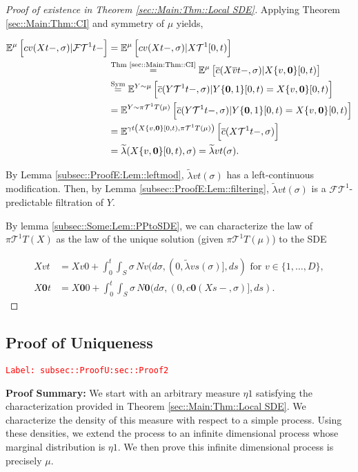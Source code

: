 \documentclass[12pt]{article}
\newcommand{\mb}{\mathbb}
\newcommand{\mc}{\mathcal}
\newcommand{\ov}{\overline}
\newcommand{\os}{\overset}
\newcommand{\te}{\text}
\newcommand{\tr}{\textcolor{red}}
\newcommand{\labe}[1]{\tr{\texttt{Label: #1}}}
\newcommand{\pfsum}{\textbf{Proof Summary: }}
\newcommand{\ind}{\hspace{24pt}}
\newcommand{\exmu}[2]{\mb{E}^{#1}\left[#2\right]}	%
\renewcommand{\root}{\mathbf{0}}				%
\renewcommand{\v}{v}							%
\renewcommand{\S}{S}							%
\newcommand{\s}{\sigma}							%
\newcommand{\T}{T}								%
\renewcommand{\t}{t}							%
\newcommand{\proj}{\pi}							%
\renewcommand{\tt}{s}							%
\newcommand{\F}{\mc{F}}							%
\newcommand{\X}{X}								%
\newcommand{\IGr}{c}							%
\newcommand{\cl}{\ov}							%
\newcommand{\degr}{D}							%
\newcommand{\IGrg}{\ov{c}}						%
\newcommand{\tree}{\mc{T}}						%
\newcommand{\sln}[1]{^{#1}}						%
\newcommand{\poiss}{N}							%
\newcommand{\alt}[1]{\widetilde{#1}}			%
\newcommand{\m}{\mu}							%
\newcommand{\mmm}{\eta}							%
\newcommand{\cm}{\gamma}						%
\newcommand{\XX}{Y}								%
\newcommand{\crate}{\alt{\lambda}}				%
\begin{document}
\begin{proof}[Proof of existence in Theorem \ref{sec::Main:Thm::Local SDE}]
Applying Theorem \ref{sec::Main:Thm::CI} and symmetry of \(\m{}{}{}\) yields,

\begin{align*}
\exmu{\m{}{}{}}{\IGr{\v}(\X{}{\t-},\s)|\F{\tree\sln{1}}{\t-}} &= \exmu{\m{}{}{}}{\IGr{\v}(\X{}{\t-},\s)|\X{\tree\sln{1}}{[0,\t)}}\\
&\os{\te{Thm \ref{sec::Main:Thm::CI}}}{=} \exmu{\m{}{}{}}{\IGrg{}(\X{\cl{\v}}{\t-},\s)|\X{\{\v,\root\}}{[0,\t)}} \\
&\os{\te{Sym}}{=} \exmu{\XX{}{}\sim \m{}{}{}}{\IGrg{}(\XX{\tree\sln{1}}{\t-},\s)|\XX{\{\root,1\}}{[0,\t)} = \X{\{\v,\root\}}{[0,\t)}}\\
&= \exmu{\XX{}{}\sim \proj{\tree\sln{1}}{\T}(\m{}{}{})}{\IGrg{}(\XX{\tree\sln{1}}{\t-},\s)|\XX{\{\root,1\}}{[0,\t)} = \X{\{\v,\root\}}{[0,\t)}}\\
&= \exmu{\cm{\t}\left(\X{\{\v,\root\}}{[0,\t)},\proj{\tree\sln{1}}{\T}(\m{}{}{})\right)}{\IGrg{}(\X{\tree\sln{1}}{\t-},\s)}\\
&=\crate{}{}(\X{\{\v,\root\}}{[0,\t)},\s) = \crate{\v}{\t}(\s).
\end{align*}

By Lemma \ref{subsec::ProofE:Lem::leftmod}, \(\crate{\v}{\t}(\s)\) has a left-continuous modification. Then, by Lemma \ref{subsec::ProofE:Lem::filtering}, \(\crate{\v}{\t}(\s)\) is a \(\F{\tree\sln{1}}{}\)-predictable filtration of \(\XX{}{}\).

\ind By lemma \ref{subsec::Some:Lem::PPtoSDE}, we can characterize the law of \(\proj{\tree\sln{1}}{\T}(\X{}{})\) as the law of the unique solution (given \(\proj{\tree\sln{1}}{\T}(\m{}{}{})\)) to the SDE

\begin{align*}
\X{\v}{\t} &= \X{\v}{0} + \int_0^\t\int_\S \s\,\poiss{\v}(d\s,(0,\crate{\v}{\tt}(\s)],d\tt) \te{ for } \v \in \{1,\dots,\degr\},\\
\X{\root}{\t} &= \X{\root}{0} + \int_0^\t\int_\S \s\,\poiss{\root}(d\s,(0,\IGr{\root}(\X{}{\tt-},\s)],d\tt).
\end{align*}
\end{proof}

\subsection{Proof of Uniqueness}
\label{subsec::ProofU:sec::Proof2}\labe{subsec::ProofU:sec::Proof2}

\pfsum We start with an arbitrary measure \(\mmm{}{}{1}\) satisfying the characterization provided in Theorem \ref{sec::Main:Thm::Local SDE}. We characterize the density of this measure with respect to a simple process. Using these densities, we extend the process to an infinite dimensional process whose marginal distribution is \(\mmm{}{}{1}\). We then prove this infinite dimensional process is precisely \(\m{}{}{}\).
\end{document}
